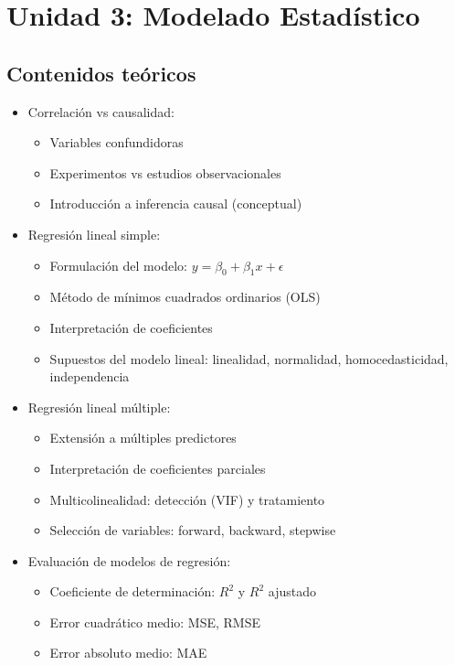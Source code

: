 \documentclass[a4paper,11pt]{article}
\begin{document}
\section{Unidad 3: Modelado Estadístico}

\subsection{Contenidos teóricos}
\begin{itemize}[leftmargin=*]
    \item Correlación vs causalidad:
    \begin{itemize}
        \item Variables confundidoras
        \item Experimentos vs estudios observacionales
        \item Introducción a inferencia causal (conceptual)
    \end{itemize}
    \item Regresión lineal simple:
    \begin{itemize}
        \item Formulación del modelo: $y = \beta_0 + \beta_1 x + \epsilon$
        \item Método de mínimos cuadrados ordinarios (OLS)
        \item Interpretación de coeficientes
        \item Supuestos del modelo lineal: linealidad, normalidad, homocedasticidad, independencia
    \end{itemize}
    \item Regresión lineal múltiple:
    \begin{itemize}
        \item Extensión a múltiples predictores
        \item Interpretación de coeficientes parciales
        \item Multicolinealidad: detección (VIF) y tratamiento
        \item Selección de variables: forward, backward, stepwise
    \end{itemize}
    \item Evaluación de modelos de regresión:
    \begin{itemize}
        \item Coeficiente de determinación: $R^2$ y $R^2$ ajustado
        \item Error cuadrático medio: MSE, RMSE
        \item Error absoluto medio: MAE

\end{itemize}
\end{itemize}
\end{document}
